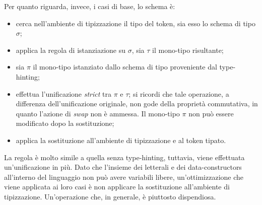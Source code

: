 \documentclass[10pt,a4paper]{article}
\begin{document}
Per quanto riguarda, invece, i casi di base, lo schema è:
\begin{itemize}
    \item cerca nell'ambiente di tipizzazione il tipo del token, sia esso lo schema di tipo $ \sigma $;
    \item applica la regola di istanziazione su $ \sigma $, sia $ \tau $ il mono-tipo risultante;
    \item sia $ \pi $ il mono-tipo istanziato dallo schema di tipo proveniente dal type-hinting;
    \item effettua l'unificazione \textit{strict} tra $ \pi $ e $ \tau $; si ricordi che tale operazione, a differenza
    dell'unificazione originale, non gode della proprietà commutativa, in quanto l'azione di \textit{swap} non è
    ammessa. Il mono-tipo $ \pi $ non può essere modificato dopo la sostituzione;
    \item applica la sostituzione all'ambiente di tipizzazione e al token tipato.
\end{itemize}
La regola è molto simile a quella senza type-hinting, tuttavia, viene effettuata un'unificazione in più.
Dato che l'insieme dei letterali e dei data-constructors all'interno del linguaggio non può avere variabili libere,
un'ottimizzazione che viene applicata ai loro casi è non applicare la sostituzione
all'ambiente di tipizzazione. Un'operazione che, in generale, è piuttosto dispendiosa.
\end{document}
